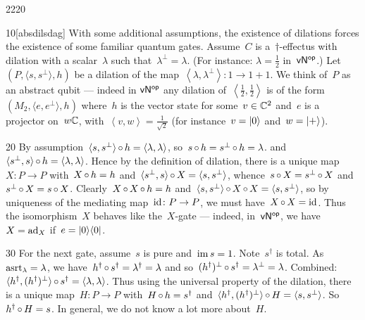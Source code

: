 \begin{parsec}{2220}%
\begin{point}{10}[absdilsdag]%
With some additional assumptions,
    the existence of dilations
    forces the existence of some
    familiar quantum gates.
Assume~$C$ is a~$\dagger$-effectus with dilation
    with a scalar~$\lambda$ such that~$\lambda^\perp = \lambda$.
    (For instance: $\lambda = \frac{1}{2}$ in~${\mathsf{vN}}{^{\mathsf{op}}}$.)
Let~$(P, \langle s,s^\perp \rangle, h)$ be a dilation
    of the map~$\left<\lambda,\lambda^\perp\right>\colon 1 \to 1+1$.
We think of~$P$ as an abstract qubit
    --- indeed in ${\mathsf{vN}}{^{\mathsf{op}}}$ any
    dilation of~$\left<\frac{1}{2},\frac{1}{2}\right>$
    is of the form~$(M_2, \langle e,e^\perp \rangle, h)$
    where~$h$ is the vector state for some~$v \in \mathbb{C}^2$
    and~$e$ is a projector on~$w\mathbb{C}$,
    with~$\left<v,w\right> = \frac{1}{\sqrt{2}}$
    (for instance~$v = \ket{0}$ and~$w = \ket{+}$).
\begin{point}{20}%
By assumption~$\langle s,s^\perp \rangle \mathop{\circ} h = \langle\lambda, \lambda\rangle$,
    so~$s \mathop{\circ} h = s^\perp \mathop{\circ} h = \lambda$.
and~$\langle s^\perp,s \rangle \mathop{\circ} h = \langle\lambda, \lambda\rangle$.
Hence by the definition of dilation,
    there is a unique map~$X \colon P \to P$
    with~$X \mathop{\circ} h = h$
    and~$\langle s^\perp, s\rangle\mathop{\circ} X = \langle s, s^\perp\rangle $,
    whence~$s \mathop{\circ} X = s^\perp \mathop{\circ} X$
    and~$s^\perp \mathop{\circ} X = s \mathop{\circ} X$.
Clearly~$X \mathop{\circ} X \mathop{\circ} h = h$
    and~$\langle s, s^\perp \rangle  \mathop{\circ} X \mathop{\circ} X 
            = \langle s, s^\perp \rangle$,
    so by uniqueness of the mediating map~$\mathrm{id} \colon P \to P$,
    we must have~$X \mathop{\circ} X = \mathrm{id}$.
Thus the isomorphism~$X$ behaves like the~$X$-gate
    --- indeed, in~${\mathsf{vN}}{^{\mathsf{op}}}$, we have~$X = \mathrm{ad}_X$
        if~$e = \left|0\right>\!\left<0\right|$.
\end{point}
\begin{point}{30}%
For the next gate,
    assume~$s$ is pure and~$\operatorname{im} s = 1$.
Note~$s^\dagger$ is total.
As~$\mathrm{asrt}_\lambda = \lambda$,
    we have~$h^\dagger \mathop{\circ} s^\dagger = \lambda^\dagger = \lambda$
    and so~$(h^\dagger)^\perp \mathop{\circ} s^\dagger = \lambda^\perp = \lambda$.
Combined:~$\langle h^\dagger, (h^\dagger)^\perp \rangle \mathop{\circ} s^\dagger
            = \langle \lambda,\lambda \rangle$.
Thus using the universal property of the dilation,
    there is a unique map~$H\colon P \to P$
    with~$H \mathop{\circ} h = s^\dagger$
    and~$\langle h^\dagger, (h^\dagger)^\perp \rangle \mathop{\circ} H =
            \langle s, s^\perp \rangle$.
So~$h^\dagger \mathop{\circ} H = s$.
In general, we do not know a lot more about~$H$.

\end{point}
\end{point}
\end{parsec}
